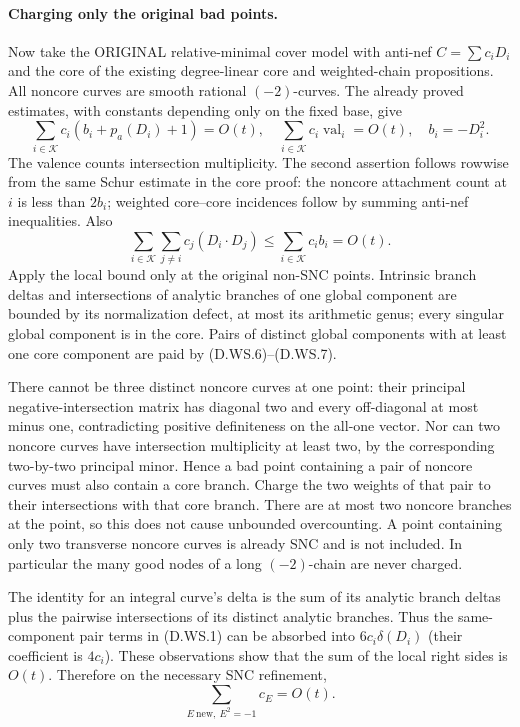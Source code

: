 \paragraph{Charging only the original bad points.}
Now take the ORIGINAL relative-minimal cover model with anti-nef
$C=\sum c_iD_i$ and the core of the existing degree-linear core and
weighted-chain propositions.  All noncore curves are smooth rational
$(-2)$-curves.  The already proved estimates, with constants depending
only on the fixed base, give
\[
 \sum_{i\in\mathcal K}c_i(b_i+p_a(D_i)+1)=O(t),
 \quad
 \sum_{i\in\mathcal K}c_i\operatorname{val}_i=O(t),
 \quad b_i=-D_i^2.                                  \tag{D.WS.6}
\]
The valence counts intersection multiplicity.  The second assertion
follows rowwise from the same Schur estimate in the core proof:
the noncore attachment count at $i$ is less than $2b_i$; weighted
core--core incidences follow by summing anti-nef inequalities.  Also
\[
 \sum_{i\in\mathcal K}\sum_{j\ne i}c_j(D_i\cdot D_j)
                  \le\sum_{i\in\mathcal K}c_i b_i=O(t).
                                                               \tag{D.WS.7}
\]
Apply the local bound only at the original non-SNC points.  Intrinsic
branch deltas and intersections of analytic branches of one global
component are bounded by its normalization defect, at most its
arithmetic genus; every singular global component is in the core.
Pairs of distinct global components with at least one core component
are paid by (D.WS.6)--(D.WS.7).

There cannot be three distinct noncore curves at one point: their
principal negative-intersection matrix has diagonal two and every
off-diagonal at most minus one, contradicting positive definiteness
on the all-one vector.  Nor can two noncore curves have intersection
multiplicity at least two, by the corresponding two-by-two principal
minor.  Hence a bad point containing a pair of noncore curves must
also contain a core branch.  Charge the two weights of that pair to
their intersections with that core branch.  There are at most two
noncore branches at the point, so this does not cause unbounded
overcounting.  A point containing only two transverse noncore curves
is already SNC and is not included.  In particular the many good
nodes of a long $(-2)$-chain are never charged.

The identity for an integral curve's delta is the sum of its analytic
branch deltas plus the pairwise intersections of its distinct analytic
branches.  Thus the same-component pair terms in (D.WS.1) can be
absorbed into $6c_i\delta(D_i)$ (their coefficient is $4c_i$).
These observations show that the sum of the local right sides is
$O(t)$.  Therefore on the necessary SNC refinement,
\[
       \sum_{E\ \mathrm{new},\ E^2=-1}c_E=O(t).        \tag{D.WS.8}
\]

